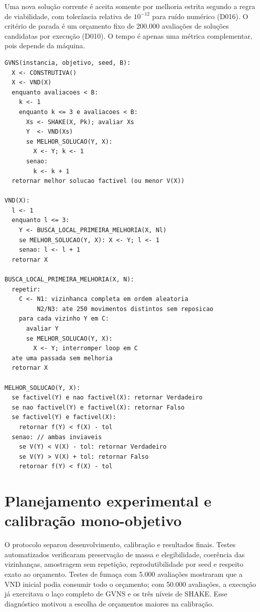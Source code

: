 \documentclass[10pt,twocolumn,a4paper]{article}
\begin{document}
Uma nova solução corrente é aceita somente por melhoria estrita segundo a regra de viabilidade, com tolerância relativa de $10^{-12}$ para ruído numérico (D016). O critério de parada é um orçamento fixo de 200.000 avaliações de soluções candidatas por execução (D010). O tempo é apenas uma métrica complementar, pois depende da máquina.

\begin{lstlisting}[float=t, caption={Pseudocódigo consolidado da GVNS e da regra de viabilidade.}, label={lst:pseudocodigo}]
GVNS(instancia, objetivo, seed, B):
  X <- CONSTRUTIVA()
  X <- VND(X)
  enquanto avaliacoes < B:
    k <- 1
    enquanto k <= 3 e avaliacoes < B:
      Xs <- SHAKE(X, Pk); avaliar Xs
      Y  <- VND(Xs)
      se MELHOR_SOLUCAO(Y, X):
        X <- Y; k <- 1
      senao:
        k <- k + 1
  retornar melhor solucao factivel (ou menor V(X))

VND(X):
  l <- 1
  enquanto l <= 3:
    Y <- BUSCA_LOCAL_PRIMEIRA_MELHORIA(X, Nl)
    se MELHOR_SOLUCAO(Y, X): X <- Y; l <- 1
    senao: l <- l + 1
  retornar X

BUSCA_LOCAL_PRIMEIRA_MELHORIA(X, N):
  repetir:
    C <- N1: vizinhanca completa em ordem aleatoria
         N2/N3: ate 250 movimentos distintos sem reposicao
    para cada vizinho Y em C:
      avaliar Y
      se MELHOR_SOLUCAO(Y, X):
        X <- Y; interromper loop em C
  ate uma passada sem melhoria
  retornar X

MELHOR_SOLUCAO(Y, X):
  se factivel(Y) e nao factivel(X): retornar Verdadeiro
  se nao factivel(Y) e factivel(X): retornar Falso
  se factivel(Y) e factivel(X):
    retornar f(Y) < f(X) - tol
  senao: // ambas inviaveis
    se V(Y) < V(X) - tol: retornar Verdadeiro
    se V(Y) > V(X) + tol: retornar Falso
    retornar f(Y) < f(X) - tol
\end{lstlisting}

\section{Planejamento experimental e calibração mono-objetivo}

O protocolo separou desenvolvimento, calibração e resultados finais. Testes automatizados verificaram preservação de massa e elegibilidade, coerência das vizinhanças, amostragem sem repetição, reprodutibilidade por seed e respeito exato ao orçamento. Testes de fumaça com 5.000 avaliações mostraram que a VND inicial podia consumir todo o orçamento; com 50.000 avaliações, a execução já exercitava o laço completo de GVNS e os três níveis de SHAKE. Esse diagnóstico motivou a escolha de orçamentos maiores na calibração.
\end{document}
